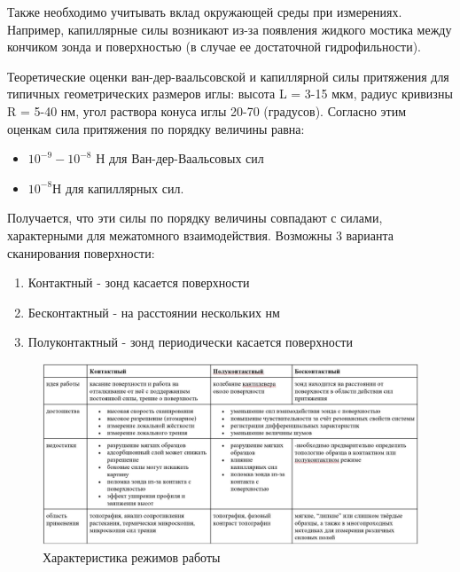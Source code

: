 \documentclass[a4paper,12pt]{article}
\theoremstyle{plain} %
\theoremstyle{definition} %
\theoremstyle{remark} %
\begin{document}
Также необходимо учитывать вклад окружающей среды при измерениях. Например, капиллярные силы возникают из-за появления жидкого мостика между кончиком зонда и поверхностью (в случае ее достаточной гидрофильности).


Теоретические оценки ван-дер-ваальсовской и капиллярной силы притяжения для типичных геометрических размеров иглы: высота L = 3-15 мкм, радиус кривизны R = 5-40 нм, угол раствора конуса иглы 20-70 (градусов). Согласно этим оценкам сила притяжения по порядку величины равна:
\begin{itemize}
	\item
	$ 10^{-9}-10^{-8} $ Н для Ван-дер-Ваальсовых сил
	\item
	$ 10^{-8} Н $ для капиллярных сил. 
	
\end{itemize}

Получается, что эти силы по порядку величины совпадают с силами, характерными для межатомного взаимодействия.
Возможны 3 варианта сканирования поверхности:
\begin{enumerate}
	\item
Контактный - зонд касается поверхности
\item
Бесконтактный - на расстоянии нескольких нм
\item
Полуконтактный - зонд периодически касается поверхности
\end{enumerate}
\begin{figure}[h!]
	\centering
	\includegraphics[scale=0.6]{pic2.jpg}
	\caption{Характеристика режимов работы}
	\label{pшс}
\end{figure}
\end{document}

